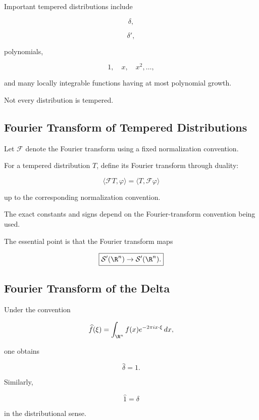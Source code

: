 Important tempered distributions include

\[
\boxed{
\delta,
}
\]

\[
\boxed{
\delta',
}
\]

polynomials,

\[
\boxed{
1,
\quad
x,
\quad
x^2,
\ldots,
}
\]

and many locally integrable functions having at most polynomial growth.

Not every distribution is tempered.

\subsection{Fourier Transform of Tempered Distributions}
\label{subsec:fourier-tempered-distributions}

Let \(\mathcal{F}\) denote the Fourier transform using a fixed
normalization convention.

For a tempered distribution \(T\), define its Fourier transform through
duality:

\[
\boxed{
\langle
\mathcal{F}T,\varphi
\rangle
=
\langle
T,\mathcal{F}\varphi
\rangle
}
\]

up to the corresponding normalization convention.

The exact constants and signs depend on the Fourier-transform convention
being used.

The essential point is that the Fourier transform maps

\[
\boxed{
\mathcal{S}'(\R^n)
\to
\mathcal{S}'(\R^n).
}
\]

\subsection{Fourier Transform of the Delta}
\label{subsec:fourier-delta}

Under the convention

\[
\widehat{f}(\xi)
=
\int_{\R^n}
f(x)e^{-2\pi i x\cdot\xi}\,dx,
\]

one obtains

\[
\boxed{
\widehat{\delta}=1.
}
\]

Similarly,

\[
\boxed{
\widehat{1}=\delta
}
\]

in the distributional sense.

